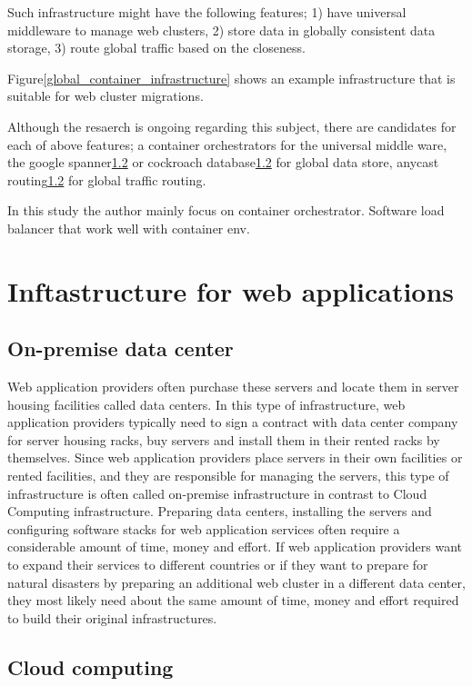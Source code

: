Such infrastructure might have the following features;
1) have universal middleware to manage web clusters,
2) store data in globally consistent data storage,
3) route global traffic based on the closeness.

Figure\ref{global_container_infrastructure} shows an example infrastructure that is suitable for web cluster migrations.

Although the resaerch is ongoing regarding this subject, there are candidates for each of above features;
a container orchestrators for the universal middle ware, the google spanner\ref{} or cockroach database\ref{} for global data store, anycast routing\ref{} for global traffic routing.

In this study the author mainly focus on container orchestrator.
Software load balancer that work well with container env.


\section{Inftastructure for web applications}

\subsection{On-premise data center}

Web application providers often purchase these servers and locate them in server housing facilities called data centers.
In this type of infrastructure, web application providers typically need to sign a contract with data center company for server housing racks, buy servers and install them in their rented racks by themselves.
Since web application providers place servers in their own facilities or rented facilities, and they are responsible for managing the servers, this type of infrastructure is often called on-premise infrastructure in contrast to Cloud Computing infrastructure.
Preparing data centers, installing the servers and configuring software stacks for web application services often require a considerable amount of time, money and effort.
If web application providers want to expand their services to different countries or if they want to prepare for natural disasters by preparing an additional web cluster in a different data center, they most likely need about the same amount of time, money and effort required to build their original infrastructures.

\subsection{Cloud computing}

